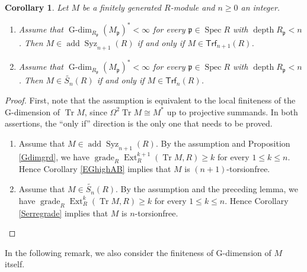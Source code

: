 \documentclass{amsart}
\newtheorem{cor}[thm]{Corollary}
\theoremstyle{definition}
\theoremstyle{remark}
\numberwithin{equation}{thm}
\def\add{\operatorname{add}}
\def\depth{\operatorname{depth}}
\def\Ext{\operatorname{Ext}}
\def\Gdim{\operatorname{G-dim}}
\def\ge{\geqslant}
\def\grade{\operatorname{grade}}
\def\le{\leqslant}
\def\p{\mathfrak{p}}
\def\spec{\operatorname{Spec}}
\def\syz{\Omega}
\def\Syz{\operatorname{Syz}}
\def\Trf{\mathsf{Trf}}
\def\tr{\operatorname{Tr}}
\begin{document}
\begin{cor}\label{MJtype}
Let $M$ be a finitely generated $R$-module and $n\ge0$ an integer.
\begin{enumerate}[\rm(1)]
\item Assume that $\Gdim_{R_\p}(M_\p)^*<\infty$ for every $\p\in\spec R$ with $\depth R_\p<n$. Then $M\in\add\Syz_{n+1}(R)$ if and only if $M\in\Trf_{n+1}(R)$.
\item Assume that $\Gdim_{R_\p}(M_\p)^*<\infty$ for every $\p\in\spec R$ with $\depth R_\p<n$. Then $M\in\widetilde{S_n}(R)$ if and only if $M\in\Trf_n(R)$.
\end{enumerate}
\end{cor}

\begin{proof}
First, note that the assumption is equivalent to the local finiteness of the G-dimension of $\tr M$, since $\syz^2\tr M\cong M^*$ up to projective summands. In both assertions, the ``only if'' direction is the only one that needs to be proved.
\begin{enumerate}[\rm(1)]
\item Assume that $M\in\add\Syz_{n+1}(R)$. By the assumption and Proposition \ref{Gdimgrd}, we have $\grade_R\Ext^{k+1}_R(\tr M,R)\ge k$ for every $1\le k\le n$. Hence Corollary \ref{EGhighAB} implies that $M$ is $(n+1)$-torsionfree.
\item Assume that $M\in\widetilde{S_n}(R)$. By the assumption and the preceding lemma, we have $\grade_R\Ext^k_R(\tr M,R)\ge k$ for every $1\le k\le n$. Hence Corollary \ref{Serregrade} implies that $M$ is $n$-torsionfree.
\end{enumerate}
\end{proof}

In the following remark, we also consider the finiteness of G-dimension of $M$ itself.
\end{document}
